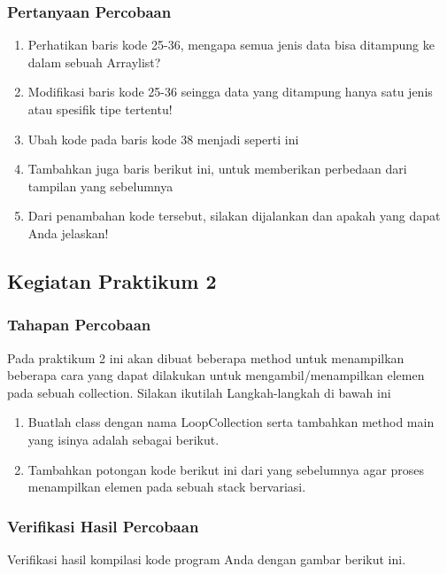 \documentclass[12pt,titlepage]{article}
\begin{document}
\subsubsection{Pertanyaan Percobaan}
\begin{enumerate}
    \item Perhatikan baris kode 25-36, mengapa semua jenis data bisa ditampung ke dalam sebuah Arraylist?
    \item Modifikasi baris kode 25-36 seingga data yang ditampung hanya satu jenis atau spesifik tipe tertentu!
    \item Ubah kode pada baris kode 38 menjadi seperti ini
    \item Tambahkan juga baris berikut ini, untuk memberikan perbedaan dari tampilan yang sebelumnya
    \item Dari penambahan kode tersebut, silakan dijalankan dan apakah yang dapat Anda jelaskan!
\end{enumerate}

\subsection{Kegiatan Praktikum 2}
\subsubsection{Tahapan Percobaan}
Pada praktikum 2 ini akan dibuat beberapa method untuk menampilkan beberapa cara yang dapat dilakukan untuk mengambil/menampilkan elemen pada sebuah collection. Silakan ikutilah Langkah-langkah di bawah ini
\begin{enumerate}
    \item Buatlah class dengan nama LoopCollection serta tambahkan method main yang isinya adalah sebagai berikut.
    \item Tambahkan potongan kode berikut ini dari yang sebelumnya agar proses menampilkan elemen pada sebuah stack bervariasi.
\end{enumerate}

\subsubsection{Verifikasi Hasil Percobaan}
Verifikasi hasil kompilasi kode program Anda dengan gambar berikut ini.
\end{document}
